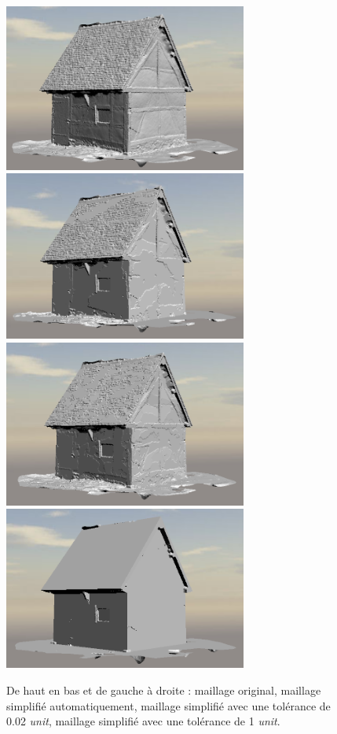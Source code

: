 ﻿\documentclass[12pt, twoside]{article}
\begin{document}
\begin{figure}[h]
\centering
\includegraphics[width=8cm,keepaspectratio]{Grange.png} \includegraphics[width=8cm,keepaspectratio]{GrangeAuto.png} \includegraphics[width=8cm,keepaspectratio]{GrangeMan002.png} \includegraphics[width=8cm,keepaspectratio]{GrangeMan1.png} 
\caption{\label{fig:niv1} De haut en bas et de gauche à droite : maillage original, maillage simplifié automatiquement, maillage simplifié avec une tolérance de 0.02 \textit{unit}, maillage simplifié avec une tolérance de 1 \textit{unit}.}
\end{figure}
\end{document}
